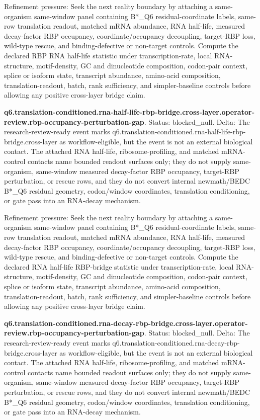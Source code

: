 Refinement pressure: Seek the next reality boundary by attaching a same-organism same-window panel containing B*\_Q6 residual-coordinate labels, same-row translation readout, matched mRNA abundance, RNA half-life, measured decay-factor RBP occupancy, coordinate/occupancy decoupling, target-RBP loss, wild-type rescue, and binding-defective or non-target controls. Compute the declared RBP RNA half-life statistic under transcription-rate, local RNA-structure, motif-density, GC and dinucleotide composition, codon-pair context, splice or isoform state, transcript abundance, amino-acid composition, translation-readout, batch, rank sufficiency, and simpler-baseline controls before allowing any positive cross-layer bridge claim.

\textbf{q6.translation-conditioned.rna-half-life-rbp-bridge.cross-layer.operator-review.rbp-occupancy-perturbation-gap}. Status: blocked\_null. Delta: The research-review-ready event marks q6.translation-conditioned.rna-half-life-rbp-bridge.cross-layer as workflow-eligible, but the event is not an external biological contact. The attached RNA half-life, ribosome-profiling, and matched mRNA-control contacts name bounded readout surfaces only; they do not supply same-organism, same-window measured decay-factor RBP occupancy, target-RBP perturbation, or rescue rows, and they do not convert internal newmath/BEDC B*\_Q6 residual geometry, codon/window coordinates, translation conditioning, or gate pass into an RNA-decay mechanism.

Refinement pressure: Seek the next reality boundary by attaching a same-organism same-window panel containing B*\_Q6 residual-coordinate labels, same-row translation readout, matched mRNA abundance, RNA half-life, measured decay-factor RBP occupancy, coordinate/occupancy decoupling, target-RBP loss, wild-type rescue, and binding-defective or non-target controls. Compute the declared RNA half-life RBP-bridge statistic under transcription-rate, local RNA-structure, motif-density, GC and dinucleotide composition, codon-pair context, splice or isoform state, transcript abundance, amino-acid composition, translation-readout, batch, rank sufficiency, and simpler-baseline controls before allowing any positive cross-layer bridge claim.

\textbf{q6.translation-conditioned.rna-decay-rbp-bridge.cross-layer.operator-review.rbp-occupancy-perturbation-gap}. Status: blocked\_null. Delta: The research-review-ready event marks q6.translation-conditioned.rna-decay-rbp-bridge.cross-layer as workflow-eligible, but the event is not an external biological contact. The attached RNA half-life, ribosome-profiling, and matched mRNA-control contacts name bounded readout surfaces only; they do not supply same-organism, same-window measured decay-factor RBP occupancy, target-RBP perturbation, or rescue rows, and they do not convert internal newmath/BEDC B*\_Q6 residual geometry, codon/window coordinates, translation conditioning, or gate pass into an RNA-decay mechanism.

